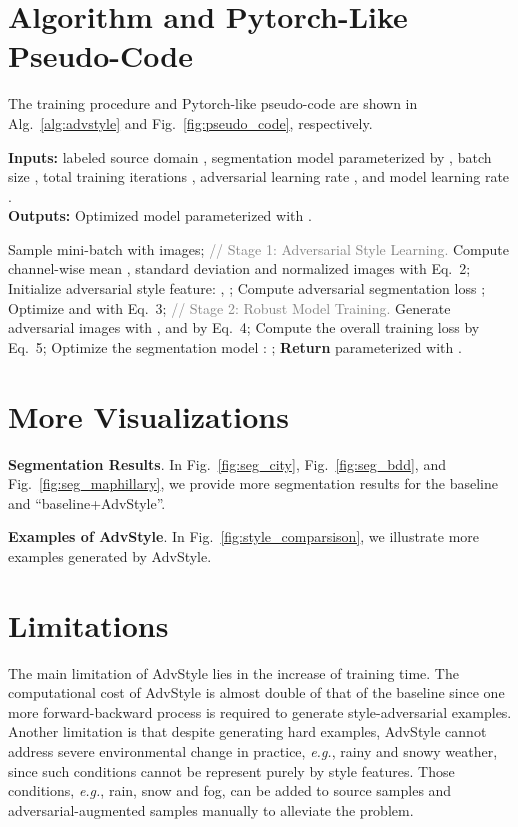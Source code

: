 \documentclass{article}
\def\eg{\emph{e.g.}} \def\Eg{\emph{E.g.}}
\newcommand{\ours}{AdvStyle\xspace}
\begin{document}
\section{Algorithm and Pytorch-Like Pseudo-Code}
\label{sec:alg-pytorch}


The training procedure and Pytorch-like pseudo-code are shown in Alg.~\ref{alg:advstyle} and Fig.~\ref{fig:pseudo_code}, respectively.


\begin{algorithm}[!ht]
    \caption{The training procedure of AdvStyle.}
    \label{alg:advstyle}
    \textbf{Inputs:} labeled source domain , segmentation model  parameterized by , batch size , total training iterations , adversarial learning rate , and model learning rate . \\
    \textbf{Outputs:} Optimized model  parameterized with .\\
\begin{algorithmic}[1]
            \STATE Sample mini-batch  with  images;
            \STATE  \textcolor{gray}{// Stage 1: Adversarial Style Learning.}
            \STATE Compute channel-wise mean , standard deviation  and normalized images  with Eq.~2;
            \STATE Initialize adversarial style feature: , ;
                \STATE Compute adversarial segmentation loss ;
                \STATE Optimize  and  with Eq.~3; 
            \STATE  \textcolor{gray}{// Stage 2: Robust Model Training.}
            \STATE Generate adversarial images  with ,  and  by Eq.~4;
            \STATE Compute the overall training loss  by Eq.~5;
            \STATE Optimize the segmentation model : ;
        \ENDFOR
        \STATE \textbf{Return}  parameterized with .
    \end{algorithmic}
\end{algorithm}


\section{More Visualizations}
\label{sec:seg_results}
\textbf{Segmentation Results}. In Fig.~\ref{fig:seg_city}, Fig.~\ref{fig:seg_bdd}, and Fig.~\ref{fig:seg_maphillary}, we provide more segmentation results for the baseline and ``baseline+\ours''.

\textbf{Examples of \ours}. In Fig.~\ref{fig:style_comparsison}, we illustrate more examples generated by \ours.

\section{Limitations}
\label{sec:limitations}
The main limitation of \ours lies in the increase of training time. The computational cost of \ours is almost double of that of the baseline since one more forward-backward process is required to generate style-adversarial examples.
Another limitation is that despite generating hard examples, \ours cannot address severe environmental change in practice, \eg, rainy and snowy weather, since such conditions cannot be represent purely by style features. Those conditions, \eg, rain, snow and fog, can be added to source samples and adversarial-augmented samples manually to alleviate the problem.
\end{document}
